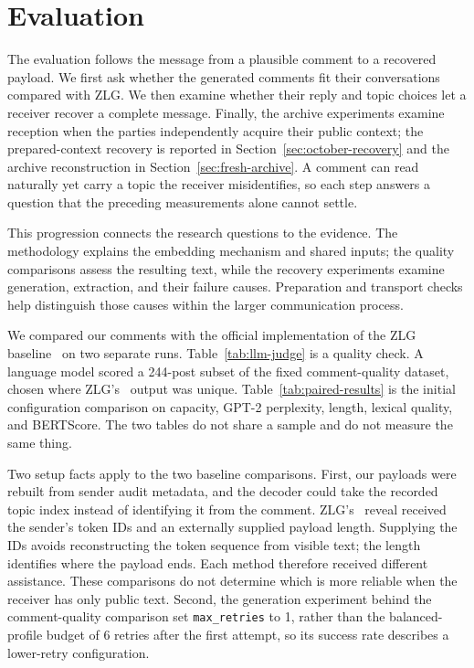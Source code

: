 \section{Evaluation}
\label{sec:evaluation}
\raggedbottom

The evaluation follows the message from a plausible comment to a recovered payload. We first ask whether the generated comments fit their conversations compared with ZLG. We then examine whether their reply and topic choices let a receiver recover a complete message. Finally, the archive experiments examine reception when the parties independently acquire their public context; the prepared-context recovery is reported in Section~\ref{sec:october-recovery} and the archive reconstruction in Section~\ref{sec:fresh-archive}. A comment can read naturally yet carry a topic the receiver misidentifies, so each step answers a question that the preceding measurements alone cannot settle.

This progression connects the research questions to the evidence. The methodology explains the embedding mechanism and shared inputs; the quality comparisons assess the resulting text, while the recovery experiments examine generation, extraction, and their failure causes. Preparation and transport checks help distinguish those causes within the larger communication process.

We compared our comments with the official implementation of the ZLG baseline~\cite{lin2024zero} on two separate runs.
Table~\ref{tab:llm-judge} is a quality check. A language model scored a 244-post subset of the fixed comment-quality dataset, chosen where ZLG's~\cite{lin2024zero} output was unique.
Table~\ref{tab:paired-results} is the initial configuration comparison on capacity, GPT-2 perplexity, length, lexical quality, and BERTScore.
The two tables do not share a sample and do not measure the same thing.

Two setup facts apply to the two baseline comparisons.
\label{par:baseline-receiver-inputs}
First, our payloads were rebuilt from sender audit metadata, and the decoder could take the recorded topic index instead of identifying it from the comment. ZLG's~\cite{lin2024zero} reveal received the sender's token IDs and an externally supplied payload length. Supplying the IDs avoids reconstructing the token sequence from visible text; the length identifies where the payload ends. Each method therefore received different assistance. These comparisons do not determine which is more reliable when the receiver has only public text.
Second, the generation experiment behind the comment-quality comparison set \texttt{max\_retries} to 1, rather than the balanced-profile budget of 6 retries after the first attempt, so its success rate describes a lower-retry configuration.


